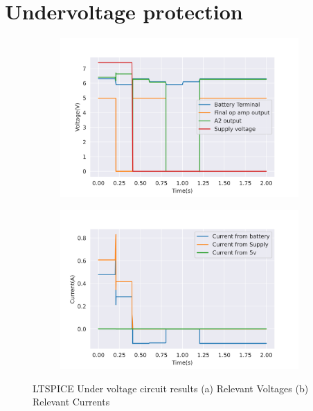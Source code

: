 \section{Undervoltage protection}
\begin{figure}[!htb]
 \footnotesize
 \centering
    \begin{subfigure}[]{0.45\textwidth}
              \centering
  		\includegraphics[width=1\linewidth]{./Figures/A31.png}
		    \caption{} \label{subfig:voltage}
     \end{subfigure}
     \begin{subfigure}[]{0.45\textwidth}
             \centering
  		\includegraphics[width=1\linewidth]{./Figures/A32.png}
		   \caption{ } \label{subfig:current}
     \end{subfigure}
   \caption[{LTSPICE Under voltage circuit results}]{LTSPICE Under voltage circuit results   (a) Relevant Voltages (b)  Relevant Currents }
    \label{fig:lt}
 \end{figure}


